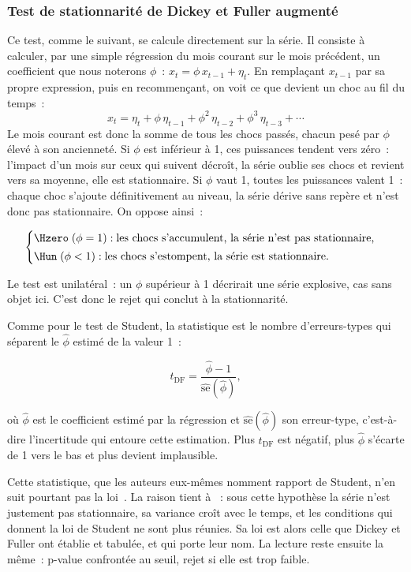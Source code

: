 \subsubsection*{Test de stationnarité de Dickey et Fuller augmenté}

Ce test, comme le suivant, se calcule directement sur la série.
Il consiste à calculer, par une simple régression du
mois courant sur le mois précédent, un coefficient que nous noterons \(\phi\)~:
\(x_t = \phi\, x_{t-1} + \eta_t\).
En remplaçant \(x_{t-1}\) par sa propre expression, puis en recommençant, on
voit ce que devient un choc au fil du temps~:
\[
  x_t = \eta_t + \phi\,\eta_{t-1} + \phi^2\,\eta_{t-2} + \phi^3\,\eta_{t-3} + \cdots
\]
Le mois courant est donc la somme de tous les chocs passés, chacun pesé par
\(\phi\) élevé à son ancienneté. Si \(\phi\) est inférieur à 1, ces puissances
tendent vers zéro~: l'impact d'un mois sur ceux qui suivent décroît, la série
oublie ses chocs et revient vers sa moyenne, elle est stationnaire. Si \(\phi\)
vaut 1, toutes les puissances valent 1~: chaque choc s'ajoute définitivement au
niveau, la série dérive sans repère et n'est donc pas stationnaire.
On oppose ainsi~:

\[
  \begin{cases}
    \Hzero \;(\phi = 1) : \text{les chocs s'accumulent, la série n'est pas stationnaire,}\\[2pt]
    \Hun \;(\phi < 1) : \text{les chocs s'estompent, la série est stationnaire.}
  \end{cases}
\]

Le test est unilatéral~: un \(\phi\) supérieur à 1 décrirait une série
explosive, cas sans objet ici. C'est donc le rejet qui conclut à la
stationnarité.

Comme pour le test de Student, la statistique est le nombre d'erreurs-types
qui séparent le \(\hat\phi\) estimé de la valeur 1~:

\[
  t_{\mathrm{DF}} = \frac{\hat\phi - 1}{\widehat{\mathrm{se}}(\hat\phi)},
\]


où \(\hat\phi\) est le coefficient estimé par la régression et
\(\widehat{\mathrm{se}}(\hat\phi)\) son erreur-type, c'est-à-dire
l'incertitude qui entoure cette estimation. Plus \(t_{\mathrm{DF}}\) est
négatif, plus \(\hat\phi\) s'écarte de 1 vers le bas et plus \Hzero{} devient
implausible.

Cette statistique, que les auteurs eux-mêmes nomment rapport de Student, n'en
suit pourtant pas la loi~\cite{dickeyfuller1979}. La raison tient à \Hzero{}~:
sous cette hypothèse la série n'est justement pas stationnaire, sa variance
croît avec le temps, et les conditions qui donnent la loi de Student ne sont
plus réunies. Sa loi est alors celle que Dickey et Fuller ont établie et
tabulée, et qui porte leur nom. La lecture reste ensuite la même~:
p-value confrontée au seuil, rejet si elle est trop faible.

